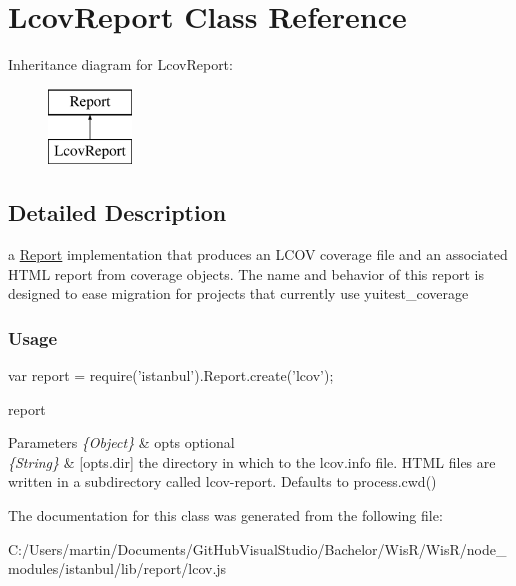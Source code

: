 \hypertarget{class_lcov_report}{}\section{Lcov\+Report Class Reference}
\label{class_lcov_report}
Inheritance diagram for Lcov\+Report\+:\begin{figure}[H]
\begin{center}
\leavevmode
\includegraphics[height=2.000000cm]{class_lcov_report}
\end{center}
\end{figure}


\subsection{Detailed Description}
a {\ttfamily \hyperlink{class_report}{Report}} implementation that produces an L\+C\+O\+V coverage file and an associated H\+T\+M\+L report from coverage objects. The name and behavior of this report is designed to ease migration for projects that currently use {\ttfamily yuitest\+\_\+coverage}

\subsubsection*{Usage }

\begin{DoxyVerb} var report = require('istanbul').Report.create('lcov');
\end{DoxyVerb}


report  
\begin{DoxyParams}{Parameters}
{\em \{\+Object\}} & opts optional \\
\hline
{\em \{\+String\}} & \mbox{[}opts.\+dir\mbox{]} the directory in which to the {\ttfamily lcov.\+info} file. H\+T\+M\+L files are written in a subdirectory called {\ttfamily lcov-\/report}. Defaults to {\ttfamily process.\+cwd()} \\
\hline
\end{DoxyParams}


The documentation for this class was generated from the following file\+:\begin{DoxyCompactItemize}
\item 
C\+:/\+Users/martin/\+Documents/\+Git\+Hub\+Visual\+Studio/\+Bachelor/\+Wis\+R/\+Wis\+R/node\+\_\+modules/istanbul/lib/report/lcov.\+js\end{DoxyCompactItemize}
